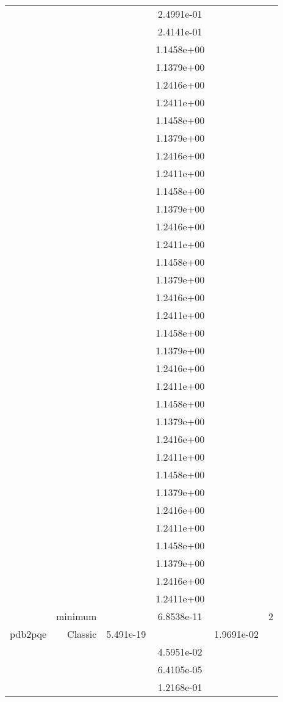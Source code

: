 \begin{xltabular}{\textwidth}{r|rS[table-format=1.3e+2]S[table-format=1.4e+2]S[table-format=1.4e+2]S[table-format=-1.5]}
&  &  & 2.4991e-01 & & \\
&  &  & 2.4141e-01 & & \\
&  &  & 1.1458e+00 & & \\
&  &  & 1.1379e+00 & & \\
&  &  & 1.2416e+00 & & \\
&  &  & 1.2411e+00 & & \\
&  &  & 1.1458e+00 & & \\
&  &  & 1.1379e+00 & & \\
&  &  & 1.2416e+00 & & \\
&  &  & 1.2411e+00 & & \\
&  &  & 1.1458e+00 & & \\
&  &  & 1.1379e+00 & & \\
&  &  & 1.2416e+00 & & \\
&  &  & 1.2411e+00 & & \\
&  &  & 1.1458e+00 & & \\
&  &  & 1.1379e+00 & & \\
&  &  & 1.2416e+00 & & \\
&  &  & 1.2411e+00 & & \\
&  &  & 1.1458e+00 & & \\
&  &  & 1.1379e+00 & & \\
&  &  & 1.2416e+00 & & \\
&  &  & 1.2411e+00 & & \\
&  &  & 1.1458e+00 & & \\
&  &  & 1.1379e+00 & & \\
&  &  & 1.2416e+00 & & \\
&  &  & 1.2411e+00 & & \\
&  &  & 1.1458e+00 & & \\
&  &  & 1.1379e+00 & & \\
&  &  & 1.2416e+00 & & \\
&  &  & 1.2411e+00 & & \\
&  &  & 1.1458e+00 & & \\
&  &  & 1.1379e+00 & & \\
&  &  & 1.2416e+00 & & \\
&  &  & 1.2411e+00 & & \\
& minimum &  & 6.8538e-11 & & 2 \\  \addlinespace
pdb2pqe & Classic & 5.491e-19 &  & 1.9691e-02 & \\
&  &  & 4.5951e-02 & & \\
&  &  & 6.4105e-05 & & \\
&  &  & 1.2168e-01 & & \\

\end{xltabular}
